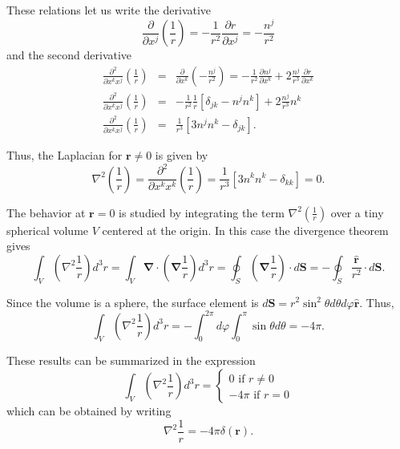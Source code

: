 These relations let us write the derivative
\begin{equation}
\frac{\partial }{\partial x^j} \left( \frac{1}{r} \right) = -\frac{1}{r^2} \frac{\partial r}{\partial x^j} = -\frac{n^j}{r^2}
\end{equation}
and the second derivative 
\begin{eqnarray}
\frac{\partial^2 }{\partial x^k x^j} \left( \frac{1}{r} \right) &=&   \frac{\partial }{\partial x^k} \left( - \frac{n^j}{r^2} \right) = -\frac{1}{r^2}  \frac{\partial n^j }{\partial x^k} + 2\frac{n^j}{r^3} \frac{\partial r }{\partial x^k} \\
\frac{\partial^2 }{\partial x^k x^j} \left( \frac{1}{r} \right) &=& -\frac{1}{r^2}  \frac{1}{r}\left[ \delta_{jk} -n^j n^k \right] + 2\frac{n^j}{r^3} n^k \\
\frac{\partial^2 }{\partial x^k x^j} \left( \frac{1}{r} \right) &=& \frac{1}{r^3} \left[ 3 n^j n^k - \delta_{jk} \right].
\end{eqnarray}

Thus, the Laplacian  for $\textbf{r} \neq 0 $ is given by
\begin{equation}
\nabla^2 \left( \frac{1}{r} \right) =\frac{\partial^2 }{\partial x^k x^k} \left( \frac{1}{r} \right) = \frac{1}{r^3} \left[ 3 n^k n^k - \delta_{kk} \right] = 0.
\end{equation}

The behavior at $\textbf{r}=0$ is studied by integrating the term $\nabla^2 \left( \frac{1}{r} \right)$ over a tiny spherical volume $V$ centered at the origin. In this case the divergence theorem gives
\begin{equation}
\int _V \left( \nabla^2 \frac{1}{r} \right) d^3 r = \int _V  \boldsymbol{\nabla} \cdot \left( \boldsymbol{\nabla} \frac{1}{r} \right) d^3 r = \oint _S \left( \boldsymbol{\nabla} \frac{1}{r} \right) \cdot d\textbf{S} = - \oint _S  \frac{\hat{\textbf{r}}}{r^2}\cdot d\textbf{S}.
\end{equation}

Since the volume is a sphere, the surface element is $d\textbf{S} = r^2 \sin^2 \theta d\theta d\varphi \hat{\textbf{r}}$. Thus,
\begin{equation}
\int _V \left( \nabla^2 \frac{1}{r} \right) d^3 r = - \int _0^{2\pi} d\varphi \int_0^\pi \sin \theta d\theta = -4\pi.
\end{equation}

These results can be summarized in the expression
\begin{equation}
\int _V \left( \nabla^2 \frac{1}{r} \right) d^3 r = 
\begin{cases}  
0 \textrm{ if } r \neq 0 \\
-4\pi \textrm{ if } r = 0
\end{cases}
\end{equation}
which can be obtained by writing
\begin{equation}
\nabla^2 \frac{1}{r} = -4\pi \delta(\textbf{r}).
\end{equation}

